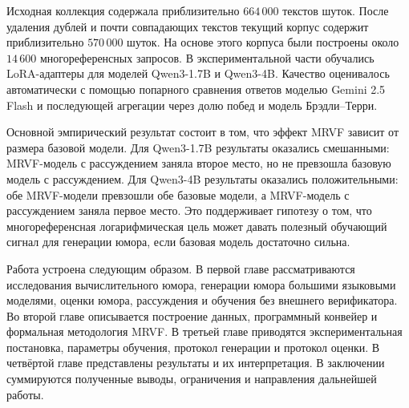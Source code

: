 Исходная коллекция содержала приблизительно \(664\,000\) текстов шуток. После удаления дублей и почти совпадающих текстов текущий корпус содержит приблизительно \(570\,000\) шуток. На основе этого корпуса были построены около \(14\,600\) многореференсных запросов. В экспериментальной части обучались LoRA-адаптеры для моделей Qwen3-1.7B и Qwen3-4B. Качество оценивалось автоматически с помощью попарного сравнения ответов моделью Gemini 2.5 Flash и последующей агрегации через долю побед и модель Брэдли--Терри.

Основной эмпирический результат состоит в том, что эффект MRVF зависит от размера базовой модели. Для Qwen3-1.7B результаты оказались смешанными: MRVF-модель с рассуждением заняла второе место, но не превзошла базовую модель с рассуждением. Для Qwen3-4B результаты оказались положительными: обе MRVF-модели превзошли обе базовые модели, а MRVF-модель с рассуждением заняла первое место. Это поддерживает гипотезу о том, что многореференсная логарифмическая цель может давать полезный обучающий сигнал для генерации юмора, если базовая модель достаточно сильна.

Работа устроена следующим образом. В первой главе рассматриваются исследования вычислительного юмора, генерации юмора большими языковыми моделями, оценки юмора, рассуждения и обучения без внешнего верификатора. Во второй главе описывается построение данных, программный конвейер и формальная методология MRVF. В третьей главе приводятся экспериментальная постановка, параметры обучения, протокол генерации и протокол оценки. В четвёртой главе представлены результаты и их интерпретация. В заключении суммируются полученные выводы, ограничения и направления дальнейшей работы.